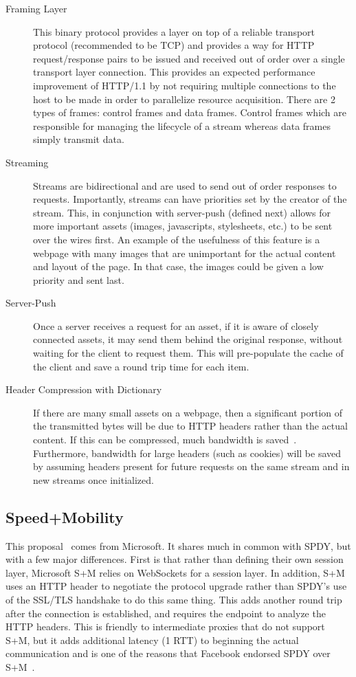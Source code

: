 \documentclass[10pt,letterpaper,notitlepage]{article}
\begin{document}
\begin{description}
\item[Framing Layer] This binary protocol provides a layer on top of a reliable transport
protocol (recommended to be TCP) and provides a way for HTTP request/response
pairs to be issued and received out of order over a single transport layer
connection.  This provides an expected performance improvement of HTTP/1.1 by
not requiring multiple connections to the host to be made in order to
parallelize resource acquisition. There are 2 types of frames: control
frames and data frames. Control frames which are responsible for managing the
lifecycle of a stream whereas data frames simply transmit data.
\item[Streaming] Streams are bidirectional and are used to send out of order
responses to requests. Importantly, streams can have priorities set by the
creator of the stream.  This, in conjunction with server-push (defined next)
allows for more important assets (images, javascripts, stylesheets, etc.) to be
sent over the wires first.  An example of the usefulness of this feature is a
webpage with many images that are unimportant for the actual content and layout
of the page.  In that case, the images could be given a low priority and sent
last.
\item[Server-Push] Once a server receives a request for an asset, if it is aware
of closely connected assets, it may send them behind the original response,
without waiting for the client to request them.  This will pre-populate the
cache of the client and save a round trip time for each item.
\item[Header Compression with Dictionary] If there are many small assets on a
webpage, then a significant portion of the transmitted bytes will be due to HTTP
headers rather than the actual content.  If this can be compressed, much
bandwidth is saved~\cite{binoy}. Furthermore, bandwidth for large headers (such
as cookies) will be saved by assuming headers present for future requests on
the same stream and in new streams once initialized.
\end{description}

\subsection{Speed+Mobility}
\label{sec:background/s+m}
This proposal~\cite{sm} comes from Microsoft.  It shares much in common with
SPDY, but with a few major differences. First is that rather than defining
their own session layer, Microsoft S+M relies on WebSockets for a session
layer.  In addition, S+M uses an HTTP header to negotiate the protocol upgrade
rather than SPDY's use of the SSL/TLS handshake to do this same thing. This
adds another round trip after the connection is established, and requires the
endpoint to analyze the HTTP headers. This is friendly to intermediate proxies
that do not support S+M, but it adds additional latency (1 RTT) to beginning
the actual communication and is one of the reasons that Facebook endorsed SPDY
over S+M~\cite{fbook}.
\end{document}
